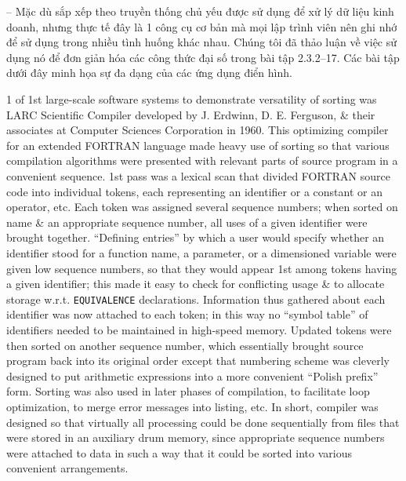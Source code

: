 \documentclass{article}
\begin{document}
\begin{itemize}
    -- Mặc dù sắp xếp theo truyền thống chủ yếu được sử dụng để xử lý dữ liệu kinh doanh, nhưng thực tế đây là 1 công cụ cơ bản mà mọi lập trình viên nên ghi nhớ để sử dụng trong nhiều tình huống khác nhau. Chúng tôi đã thảo luận về việc sử dụng nó để đơn giản hóa các công thức đại số trong bài tập 2.3.2--17. Các bài tập dưới đây minh họa sự đa dạng của các ứng dụng điển hình.
    
    1 of 1st large-scale software systems to demonstrate versatility of sorting was LARC Scientific Compiler developed by {\sc J. Erdwinn, D. E. Ferguson}, \& their associates at Computer Sciences Corporation in 1960. This optimizing compiler for an extended FORTRAN language made heavy use of sorting so that various compilation algorithms were presented with relevant parts of source program in a convenient sequence. 1st pass was a lexical scan that divided FORTRAN source code into individual tokens, each representing an identifier or a constant or an operator, etc. Each token was assigned several sequence numbers; when sorted on name \& an appropriate sequence number, all uses of a given identifier were brought together. ``Defining entries'' by which a user would specify whether an identifier stood for a function name, a parameter, or a dimensioned variable were given low sequence numbers, so that they would appear 1st among tokens having a given identifier; this made it easy to check for conflicting usage \& to allocate storage w.r.t. {\tt EQUIVALENCE} declarations. Information thus gathered about each identifier was now attached to each token; in this way no ``symbol table'' of identifiers needed to be maintained in high-speed memory. Updated tokens were then sorted on another sequence number, which essentially brought source program back into its original order except that numbering scheme was cleverly designed to put arithmetic expressions into a more convenient ``Polish prefix'' form. Sorting was also used in later phases of compilation, to facilitate loop optimization, to merge error messages into listing, etc. In short, compiler was designed so that virtually all processing could be done sequentially from files that were stored in an auxiliary drum memory, since appropriate sequence numbers were attached to data in such a way that it could be sorted into various convenient arrangements.
    

\end{itemize}
\end{document}

